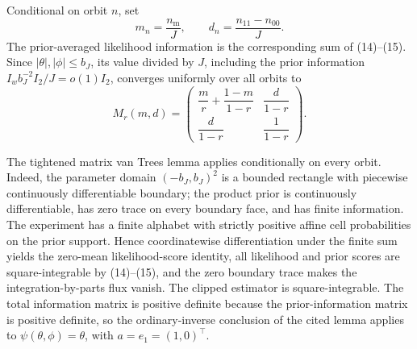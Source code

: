 Conditional on orbit \(n\), set
\[
 m_n=\frac{n_{\mathrm m}}J,
 \qquad
 d_n=\frac{n_{11}-n_{00}}J.
\]
The prior-averaged likelihood information is the corresponding sum of (14)--(15).  Since \(|\theta|,|\phi|\le b_J\), its value divided by \(J\), including the prior information \(I_w b_J^{-2}I_2/J=o(1)I_2\), converges uniformly over all orbits to
\[
 M_r(m,d)=
 \begin{pmatrix}
 \dfrac m r+\dfrac{1-m}{1-r}&\dfrac d{1-r}\\[6pt]
 \dfrac d{1-r}&\dfrac1{1-r}
 \end{pmatrix}.
 \tag{16}
\]

The tightened matrix van Trees lemma applies conditionally on every orbit.  Indeed, the parameter domain \((-b_J,b_J)^2\) is a bounded rectangle with piecewise continuously differentiable boundary; the product prior is continuously differentiable, has zero trace on every boundary face, and has finite information.  The experiment has a finite alphabet with strictly positive affine cell probabilities on the prior support.  Hence coordinatewise differentiation under the finite sum yields the zero-mean likelihood-score identity, all likelihood and prior scores are square-integrable by (14)--(15), and the zero boundary trace makes the integration-by-parts flux vanish.  The clipped estimator is square-integrable.  The total information matrix is positive definite because the prior-information matrix is positive definite, so the ordinary-inverse conclusion of the cited lemma applies to \(\psi(\theta,\phi)=\theta\), with \(a=e_1=(1,0)^{\!\top}\).

